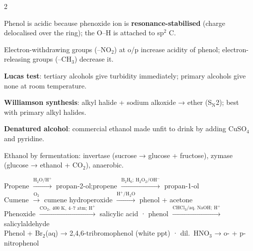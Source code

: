 \documentclass[10pt,a4paper]{extarticle}
\begin{document}
\begin{multicols}{2}
\begin{fl}
\item Phenol is acidic because phenoxide ion is \textbf{resonance-stabilised} (charge delocalised over the ring); the O--H is attached to sp$^2$ C.
\item Electron-withdrawing groups (--NO$_2$) at o/p increase acidity of phenol; electron-releasing groups (--CH$_3$) decrease it.
\item \textbf{Lucas test}: tertiary alcohols give turbidity immediately; primary alcohols give none at room temperature.
\item \textbf{Williamson synthesis}: alkyl halide + sodium alkoxide → ether (S$_\text{N}$2); best with primary alkyl halides.
\item \textbf{Denatured alcohol}: commercial ethanol made unfit to drink by adding CuSO$_4$ and pyridine.
\item Ethanol by fermentation: invertase (sucrose → glucose + fructose), zymase (glucose → ethanol + CO$_2$), anaerobic.
\end{fl}

\begin{kbox}
Propene $\xrightarrow{\text{H}_2\text{O}/\text{H}^+}$ propan-2-ol;\quad propene $\xrightarrow{\text{B}_2\text{H}_6;\ \text{H}_2\text{O}_2/\text{OH}^-}$ propan-1-ol\\[1pt]
Cumene $\xrightarrow{\text{O}_2}$ cumene hydroperoxide $\xrightarrow{\text{H}^+/\text{H}_2\text{O}}$ phenol + acetone\\[1pt]
Phenoxide $\xrightarrow{\text{CO}_2,\ 400\text{ K},\ 4\text{--}7\text{ atm};\ \text{H}^+}$ salicylic acid \;·\; phenol $\xrightarrow{\text{CHCl}_3/\text{aq. NaOH};\ \text{H}^+}$ salicylaldehyde\\[1pt]
Phenol + Br$_2$(aq) → 2,4,6-tribromophenol (white ppt) \;·\; dil.\ HNO$_3$ → o- + p-nitrophenol\\[1pt]
\quad {}
\end{kbox}


\end{multicols}
\end{document}

